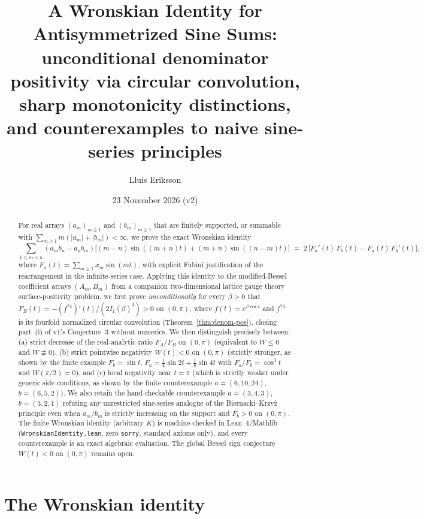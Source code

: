 \documentclass[11pt]{article}
\title{A Wronskian Identity for Antisymmetrized Sine Sums:\\
\large unconditional denominator positivity via circular convolution,\\
sharp monotonicity distinctions, and counterexamples to naive sine-series principles}
\author{Lluis Eriksson}
\date{23 November 2026 (v2)}
\theoremstyle{remark}
\begin{document}
\maketitle

\begin{abstract}
For real arrays $(a_m)_{m\ge 1}$ and $(b_m)_{m\ge 1}$ that are finitely supported, or
summable with $\sum_{m\ge 1} m(|a_m|+|b_m|) < \infty$, we prove the exact Wronskian identity
\[
\sum_{1 \le m < n} (a_m b_n - a_n b_m)
\bigl[(m-n)\sin((m+n)t) + (m+n)\sin((n-m)t)\bigr]
\;=\; 2\,\bigl[F_a'(t)\,F_b(t) - F_a(t)\,F_b'(t)\bigr],
\]
where $F_x(t) = \sum_{m\ge 1} x_m \sin(mt)$, with explicit Fubini justification of the
rearrangement in the infinite-series case. Applying this identity to the modified-Bessel
coefficient arrays $(A_m, B_m)$ from a companion two-dimensional lattice gauge theory
surface-positivity problem, we first prove \emph{unconditionally} for every $\beta > 0$
that $F_B(t) = -(f^{*4})'(t)/(2 I_1(\beta)^4) > 0$ on $(0,\pi)$, where
$f(t)=e^{\beta\cos t}$ and $f^{*4}$ is its fourfold normalized circular convolution
(Theorem~\ref{thm:denom-pos}), closing part~(i) of v1's Conjecture~3 without numerics.
We then distinguish precisely between: (a) strict decrease of the real-analytic ratio
$F_A/F_B$ on $(0,\pi)$ (equivalent to $W \le 0$ and $W \not\equiv 0$), (b) strict
pointwise negativity $W(t) < 0$ on $(0,\pi)$ (strictly stronger, as shown by the finite
example $F_b=\sin t$, $F_a = \frac{1}{4}\sin 2t + \frac{1}{8}\sin 4t$ with
$F_a/F_b = \cos^3 t$ and $W(\pi/2)=0$), and (c) local negativity near $t=\pi$ (which is
strictly weaker under generic side conditions, as shown by the finite counterexample
$a=(6,10,24)$, $b=(6,5,2)$). We also retain the hand-checkable counterexample
$a=(3,4,3)$, $b=(3,2,1)$ refuting any unrestricted sine-series analogue of the
Biernacki--Krzy\.z principle even when $a_m/b_m$ is strictly increasing on the support
and $F_b > 0$ on $(0,\pi)$. The finite Wronskian identity (arbitrary $K$) is
machine-checked in Lean~4/Mathlib (\texttt{WronskianIdentity.lean}, zero \texttt{sorry},
standard axioms only), and every counterexample is an exact algebraic evaluation. The
global Bessel sign conjecture $W(t) < 0$ on $(0,\pi)$ remains open.
\end{abstract}

\section{The Wronskian identity}
\end{document}

